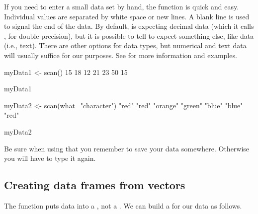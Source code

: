 If you need to enter a small data set by hand, 
the  function is quick and easy.
%
Individual values are separated by white space or new lines.  
A blank line is used to signal the end of the data.
By default,  is expecting decimal data (which it calls , 
for double precision), but it is possible to tell  to expect something else,
like  data (i.e., text). 
There are other options for data types, but numerical and text data will usually suffice
for our purposes.  See  for more information and examples.

\begin{Rcode}
myData1 <- scan()
15 18
12
21 23 50 15

myData1

myData2 <- scan(what="character")
"red" "red" "orange" "green" "blue" "blue" "red"

myData2
\end{Rcode}



%
Be sure when using  that you remember to save your data somewhere.
Otherwise you will have to type it again.

\subsection{Creating data frames from vectors}

%
The  function puts data into a , not a .  We can
build a  for our data as follows.

\begin{knitrout}
\end{knitrout}


